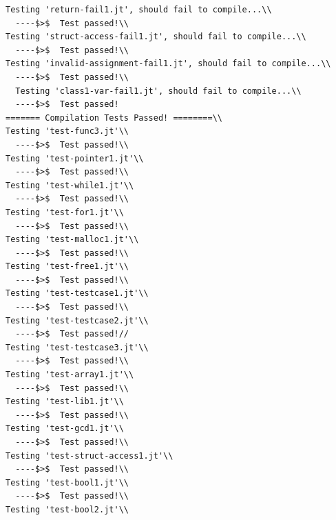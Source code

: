 \documentclass{article}
\begin{document}
\begin{lstlisting}
Testing 'return-fail1.jt', should fail to compile...\\
  ----$>$  Test passed!\\
Testing 'struct-access-fail1.jt', should fail to compile...\\
  ----$>$  Test passed!\\
Testing 'invalid-assignment-fail1.jt', should fail to compile...\\
  ----$>$  Test passed!\\
  Testing 'class1-var-fail1.jt', should fail to compile...\\
  ----$>$  Test passed!
======= Compilation Tests Passed! ========\\
Testing 'test-func3.jt'\\
  ----$>$  Test passed!\\
Testing 'test-pointer1.jt'\\
  ----$>$  Test passed!\\
Testing 'test-while1.jt'\\
  ----$>$  Test passed!\\
Testing 'test-for1.jt'\\
  ----$>$  Test passed!\\
Testing 'test-malloc1.jt'\\
  ----$>$  Test passed!\\
Testing 'test-free1.jt'\\
  ----$>$  Test passed!\\
Testing 'test-testcase1.jt'\\
  ----$>$  Test passed!\\
Testing 'test-testcase2.jt'\\
  ----$>$  Test passed!//
Testing 'test-testcase3.jt'\\
  ----$>$  Test passed!\\
Testing 'test-array1.jt'\\
  ----$>$  Test passed!\\
Testing 'test-lib1.jt'\\
  ----$>$  Test passed!\\
Testing 'test-gcd1.jt'\\
  ----$>$  Test passed!\\
Testing 'test-struct-access1.jt'\\
  ----$>$  Test passed!\\
Testing 'test-bool1.jt'\\
  ----$>$  Test passed!\\
Testing 'test-bool2.jt'\\

\end{lstlisting}
\end{document}
